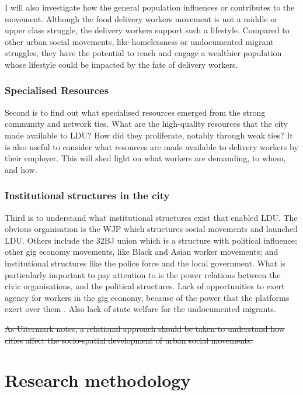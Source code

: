 \documentclass{article}
\begin{document}
I will also investigate how the general population influences or contributes to the movement. Although the food delivery workers movement is not a middle or upper class struggle, the delivery workers support such a lifestyle. Compared to other urban social movements, like homelessness or undocumented migrant struggles, they have the potential to reach and engage a wealthier population whose lifestyle could be impacted by the fate of delivery workers. 

\subsubsection{Specialised Resources}

Second is to find out what specialised resources emerged from the strong community and network ties. What are the high-quality resources that the city made available to LDU? How did they proliferate, notably through weak ties?
It is also useful to consider what resources are made available to delivery workers by their employer. This will shed light on what workers are demanding, to whom, and how.

\subsubsection{Institutional structures in the city}

Third is to understand what institutional structures exist that enabled LDU. The obvious organisation is the WJP which structures social movements and launched LDU. Others include the 32BJ union which is a structure with political influence; other gig economy movements, like Black and Asian worker movements; and institutional structures like the police force and the local government. What is particularly important to pay attention to is the power relations between the civic organisations, and the political structures.
Lack of opportunities to exert agency for workers in the gig economy, because of the power that the platforms exert over them \parencite{anwar2020hidden}. Also lack of state welfare for the undocumented migrants.

\sout{As Uitermark notes, a relational approach should be taken to understand how cities affect the socio-spatial development of urban social movements.} %

\section{Research methodology}
\end{document}
